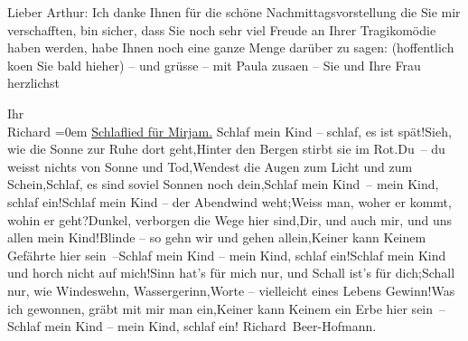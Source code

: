\pstart
           Lieber Arthur: Ich danke Ihnen für die schöne Nachmittagsvorstellung die Sie mir
               verschafften, bin sicher, dass Sie noch sehr viel Freude an Ihrer Tragikomödie haben werden, habe Ihnen noch
               eine ganze Menge darüber zu sagen: (hoffentlich ko{\geminationm}en
               Sie bald hieher) – und grüsse – mit Paula
                  zusa{\geminationm}en – Sie und Ihre Frau herzlichst\pend
           
\pstart
           Ihr{\\[\baselineskip]}\spacefill\mbox{Richard}\pend
           \leftskip=0em{}\vspace{1em}{\vspace{1\baselineskip}}
\pstart
           \centering{}{\pb}\uline{Schlaflied für Mirjam.}\pend
           {\vspace{1\baselineskip}}\stanza{}Schlaf mein Kind – schlaf, es ist spät!\newverse{}Sieh, wie die Sonne zur Ruhe dort geht,\newverse{}Hinter den Bergen stirbt sie im Rot.\newverse{}Du – du weisst nichts von Sonne und Tod,\newverse{}Wendest die Augen zum Licht und zum Schein,\newverse{}Schlaf, es sind soviel Sonnen noch dein,\newverse{}Schlaf mein Kind – mein Kind, schlaf ein!\stanzaend{}\stanza{}Schlaf mein Kind – der Abendwind weht;\newverse{}Weiss man, woher er kommt, wohin er geht?\newverse{}Dunkel, verborgen die Wege hier sind,\newverse{}Dir, und auch mir, und uns allen mein Kind!\newverse{}Blinde – so gehn wir und gehen allein,\newverse{}Keiner kann Keinem Gefährte hier sein –\newverse{}Schlaf mein Kind – mein Kind, schlaf ein!\stanzaend{}\stanza{}Schlaf mein Kind und horch nicht auf mich!\newverse{}Sinn hat’s für mich nur, und Schall ist’s für dich;\newverse{}Schall nur, wie Windeswehn, Wassergerinn,\newverse{}Worte – vielleicht eines Lebens Gewinn!\newverse{}Was ich gewonnen, gräbt mit mir man ein,\newverse{}Keiner kann Keinem ein Erbe hier sein –\newverse{}Schlaf mein Kind – mein Kind, schlaf ein!\stanzaend{}
\pstart
           \spacefill\mbox{Richard Beer-Hofmann.}\pend
           \endnumbering{}  \newcommand{\dateiname}{L01942}\newcommand{\titel}{Richard Beer-Hofmann an Arthur Schnitzler, 7. 7. 1910}\newcommand{\editorInnen}{Martin Anton Müller und Gerd-Hermann Susen}
